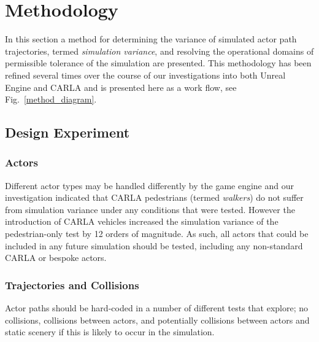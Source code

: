 \documentclass[letterpaper, 10 pt, journal, twoside]{IEEEtran}
\begin{document}
\section{Methodology} \label{s:methodology}
In this section a method for determining the variance of simulated actor path trajectories, termed \textit{simulation variance}, and resolving the operational domains of permissible tolerance of the simulation are presented. 
%
This methodology has been refined several times over the course of our investigations into both Unreal Engine and CARLA and is presented here as a work flow, see Fig.~\ref{method_diagram}. %
%
\subsection{Design Experiment}\label{s:design_experiment}

\subsubsection{Actors} \label{s:actors}

Different actor types may be handled differently by the game engine and our investigation indicated that CARLA pedestrians (termed \textit{walkers}) do not suffer from simulation variance under any conditions that were tested. However the introduction of CARLA vehicles increased the simulation variance of the pedestrian-only test by 12 orders of magnitude. As such, all actors that could be included in any future simulation should be tested, including any non-standard CARLA or bespoke actors.
%
\subsubsection{Trajectories and Collisions} 
Actor paths should be hard-coded in a number of different tests that explore; no collisions, collisions between actors, and potentially collisions between actors and static scenery if this is likely to occur in the simulation.
\end{document}
